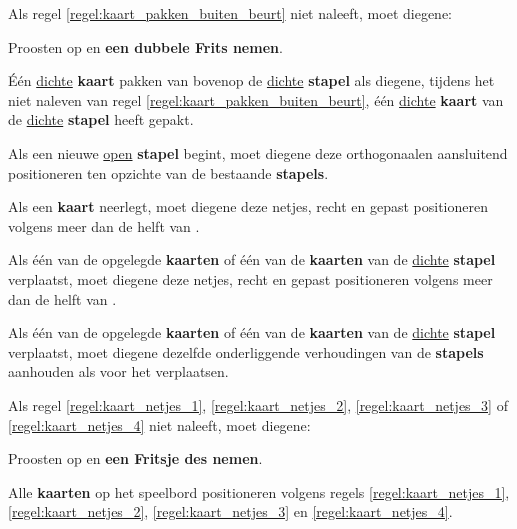 \vervolgLijst{}
\item Als \eenSpeler regel \ref{regel:kaart_pakken_buiten_beurt} niet naleeft, moet diegene:
\puntLijst{}
\item Proosten op  en \textbf{een dubbele Frits nemen}\footnotemark[1].
\item Één \ul{dichte} \textbf{kaart} pakken van bovenop de \ul{dichte} \textbf{stapel} als diegene, tijdens het niet naleven van regel \ref{regel:kaart_pakken_buiten_beurt}, één \ul{dichte} \textbf{kaart} van de \ul{dichte} \textbf{stapel} heeft gepakt.
\eindPuntLijst{}
\label{regel:kaart_pakken_buiten_beurt_straf}
\eindLijst{}


\vervolgLijst{}
\item Als \eenSpeler een nieuwe \ul{open} \textbf{stapel} begint, moet diegene deze orthogonaal\footnotemark[2] en aansluitend positioneren ten opzichte van de bestaande \textbf{stapels}.
\label{regel:kaart_netjes_1}
\eindLijst{}

\vervolgLijst{}
\item Als \eenSpeler een \textbf{kaart} neerlegt, moet diegene deze netjes, recht en gepast positioneren volgens meer dan de helft van \alleSpelersN.
\label{regel:kaart_netjes_2}
\eindLijst{}

\vervolgLijst{}
\item Als \eenSpeler één van de opgelegde \textbf{kaarten} of één van de \textbf{kaarten} van de \ul{dichte} \textbf{stapel} verplaatst, moet diegene deze netjes, recht en gepast positioneren volgens meer dan de helft van \alleSpelersN.
\label{regel:kaart_netjes_3}
\eindLijst{}

\vervolgLijst{}
\item Als \eenSpeler één van de opgelegde \textbf{kaarten} of één van de \textbf{kaarten} van de \ul{dichte} \textbf{stapel} verplaatst, moet diegene dezelfde onderliggende verhoudingen van de \textbf{stapels} aanhouden als voor het verplaatsen.
\label{regel:kaart_netjes_4}
\eindLijst{}

\vervolgLijst{}
\item Als \eenSpeler regel \ref{regel:kaart_netjes_1}, \ref{regel:kaart_netjes_2}, \ref{regel:kaart_netjes_3} of \ref{regel:kaart_netjes_4} niet naleeft, moet diegene:
\puntLijst{}
\item Proosten op  en \textbf{een Fritsje des nemen}\footnotemark[3].
\item Alle \textbf{kaarten} op het speelbord positioneren volgens regels \ref{regel:kaart_netjes_1}, \ref{regel:kaart_netjes_2}, \ref{regel:kaart_netjes_3} en \ref{regel:kaart_netjes_4}.
\eindPuntLijst{}
\eindLijst{}

